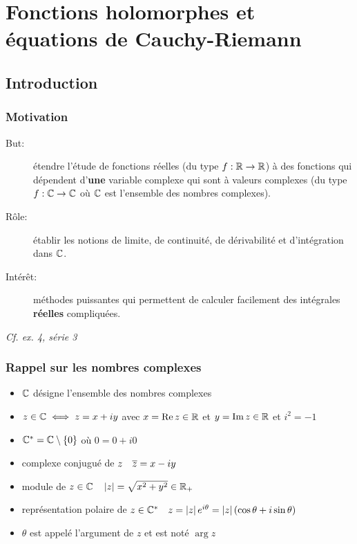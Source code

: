 \chapter{Fonctions holomorphes et équations de Cauchy-Riemann}


\section{Introduction}

\subsection{Motivation}

\begin{description}
    \item[But:] étendre l'étude de fonctions réelles (du type $f: \mathbb{R} \rightarrow \mathbb{R}$) à des fonctions qui dépendent d'\textbf{une} variable complexe qui sont à valeurs complexes (du type $f: \mathbb{C} \rightarrow \mathbb{C}$ où $\mathbb{C}$ est l'ensemble des nombres complexes).
    
    \item[Rôle:] établir les notions de limite, de continuité, de dérivabilité et d'intégration dans $\mathbb{C}$.
    
    \item[Intérêt:] méthodes puissantes qui permettent de calculer facilement des intégrales \textbf{ré\-elles} compliquées.
\end{description}

\textit{Cf. ex. 4, série 3}

\subsection{Rappel sur les nombres complexes}

\begin{itemize}
    \item 
    $\mathbb{C}$ désigne l'ensemble des nombres complexes
    \item 
    $z \in \mathbb{C} \iff z = x + iy$ avec $x = \operatorname{Re} z \in \mathbb{R}$ et $y = \operatorname{Im} z \in \mathbb{R}$ et $i^2 = -1$
    \item 
    $\mathbb{C}^* = \mathbb{C} \setminus \{0\}$ où $0 = 0 + i0$
    \item 
    complexe conjugué de $z \quad \overline{z} = x - iy$ 
    \item 
    module de $z \in \mathbb{C} \quad \left|z\right| = \sqrt{x^2 + y^2} \in \mathbb{R}_+$
    \item 
    représentation polaire de $z \in \mathbb{C}^* \quad z = \left|z\right| e^{i\theta} = \left|z\right| (\cos \theta + i \sin \theta)$
    \item 
    $\theta$ est appelé l'argument de $z$ et est noté $\arg z$
\end{itemize}

